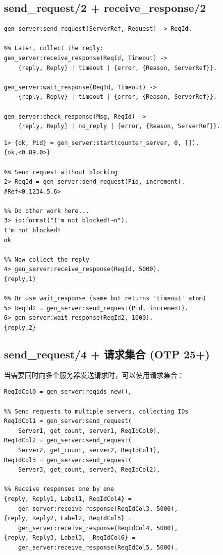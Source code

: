 \documentclass[a4paper,11pt]{article}
\begin{document}
\subsection{send\_request/2 + receive\_response/2}

\begin{lstlisting}[style=erlangstyle, caption={send\_request 函数签名}]
gen_server:send_request(ServerRef, Request) -> ReqId.

%% Later, collect the reply:
gen_server:receive_response(ReqId, Timeout) ->
    {reply, Reply} | timeout | {error, {Reason, ServerRef}}.

gen_server:wait_response(ReqId, Timeout) ->
    {reply, Reply} | timeout | {error, {Reason, ServerRef}}.

gen_server:check_response(Msg, ReqId) ->
    {reply, Reply} | no_reply | {error, {Reason, ServerRef}}.
\end{lstlisting}

\begin{lstlisting}[style=shellstyle, caption={send\_request 交互演示}]
1> {ok, Pid} = gen_server:start(counter_server, 0, []).
{ok,<0.89.0>}

%% Send request without blocking
2> ReqId = gen_server:send_request(Pid, increment).
#Ref<0.1234.5.6>

%% Do other work here...
3> io:format("I'm not blocked!~n").
I'm not blocked!
ok

%% Now collect the reply
4> gen_server:receive_response(ReqId, 5000).
{reply,1}

%% Or use wait_response (same but returns 'timeout' atom)
5> ReqId2 = gen_server:send_request(Pid, increment).
6> gen_server:wait_response(ReqId2, 1000).
{reply,2}
\end{lstlisting}

\subsection{send\_request/4 + 请求集合 (OTP 25+)}

当需要同时向多个服务器发送请求时，可以使用请求集合：

\begin{lstlisting}[style=erlangstyle, caption={请求集合用法}]
%% Create a request ID collection
ReqIdCol0 = gen_server:reqids_new(),

%% Send requests to multiple servers, collecting IDs
ReqIdCol1 = gen_server:send_request(
    Server1, get_count, server1, ReqIdCol0),
ReqIdCol2 = gen_server:send_request(
    Server2, get_count, server2, ReqIdCol1),
ReqIdCol3 = gen_server:send_request(
    Server3, get_count, server3, ReqIdCol2),

%% Receive responses one by one
{reply, Reply1, Label1, ReqIdCol4} =
    gen_server:receive_response(ReqIdCol3, 5000),
{reply, Reply2, Label2, ReqIdCol5} =
    gen_server:receive_response(ReqIdCol4, 5000),
{reply, Reply3, Label3, _ReqIdCol6} =
    gen_server:receive_response(ReqIdCol5, 5000).
\end{lstlisting}
\end{document}
